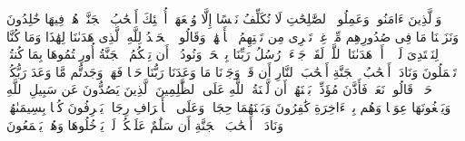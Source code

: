 \stopbuffer
\startbuffer[\q:7:42]
وَٱلَّذِینَ ءَامَنُوا۟ وَعَمِلُوا۟ ٱلصَّٰلِحَٰتِ لَا نُكَلِّفُ نَفۡسًا إِلَّا وُسۡعَهَاۤ أُو۟لَٰۤئِكَ أَصۡحَٰبُ ٱلۡجَنَّةِۖ هُمۡ فِیهَا خَٰلِدُونَ%
\stopbuffer
\startbuffer[\q:7:43]
وَنَزَعۡنَا مَا فِی صُدُورِهِم مِّنۡ غِلࣲّ تَجۡرِی مِن تَحۡتِهِمُ ٱلۡأَنۡهَٰرُۖ وَقَالُوا۟ ٱلۡحَمۡدُ لِلَّهِ ٱلَّذِی هَدَىٰنَا لِهَٰذَا وَمَا كُنَّا لِنَهۡتَدِیَ لَوۡلَاۤ أَنۡ هَدَىٰنَا ٱللَّهُۖ لَقَدۡ جَاۤءَتۡ رُسُلُ رَبِّنَا بِٱلۡحَقِّۖ وَنُودُوۤا۟ أَن تِلۡكُمُ ٱلۡجَنَّةُ أُورِثۡتُمُوهَا بِمَا كُنتُمۡ تَعۡمَلُونَ%
\stopbuffer
\startbuffer[\q:7:44]
وَنَادَىٰۤ أَصۡحَٰبُ ٱلۡجَنَّةِ أَصۡحَٰبَ ٱلنَّارِ أَن قَدۡ وَجَدۡنَا مَا وَعَدَنَا رَبُّنَا حَقࣰّا فَهَلۡ وَجَدتُّم مَّا وَعَدَ رَبُّكُمۡ حَقࣰّاۖ قَالُوا۟ نَعَمۡۚ فَأَذَّنَ مُؤَذِّنُۢ بَیۡنَهُمۡ أَن لَّعۡنَةُ ٱللَّهِ عَلَى ٱلظَّٰلِمِینَ%
\stopbuffer
\startbuffer[\q:7:45]
ٱلَّذِینَ یَصُدُّونَ عَن سَبِیلِ ٱللَّهِ وَیَبۡغُونَهَا عِوَجࣰا وَهُم بِٱلۡءَاخِرَةِ كَٰفِرُونَ%
\stopbuffer
\startbuffer[\q:7:46]
وَبَیۡنَهُمَا حِجَابࣱۚ وَعَلَى ٱلۡأَعۡرَافِ رِجَالࣱ یَعۡرِفُونَ كُلَّۢا بِسِیمَىٰهُمۡۚ وَنَادَوۡا۟ أَصۡحَٰبَ ٱلۡجَنَّةِ أَن سَلَٰمٌ عَلَیۡكُمۡۚ لَمۡ یَدۡخُلُوهَا وَهُمۡ یَطۡمَعُونَ%
\stopbuffer
